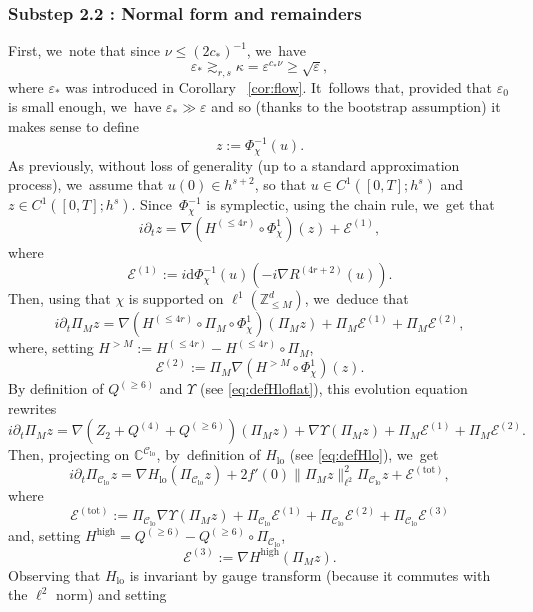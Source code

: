 \documentclass[JEP,XML,SOM,Unicode,published]{cedram}
\theoremstyle{plain}
\theoremstyle{definition}
\DeclareMathOperator{\lo}{lo}
\newcommand{\1}{\mathbf{1}}
\newcommand{\Clo}{\mathscr{C}_{\lo}}
\let\epsilon\varepsilon
\begin{document}
\subsubsection*{Substep 2.2 : Normal form and remainders}
First, we~note that since $\nu\leq(2c_\ast)^{-1}$, we~have
\begin{equation}
\label{eq:kappa_vs_eps1}
\varepsilon_\ast \gtrsim_{r,s} \kappa = \varepsilon^{c_\ast \nu} \geq \sqrt{\varepsilon},
\end{equation}
where $\epsilon_{\ast}$ was introduced in Corollary ~\ref{cor:flow}. It~follows that, provided that $\varepsilon_0$ is small enough, we~have $\varepsilon_\ast \gg \varepsilon$ and so (thanks to the bootstrap assumption) it makes sense to define
\[
z := \Phi_\chi^{-1}(u).
\]
As previously, without loss of generality (\ie up to a standard approximation process), we~assume that $u(0) \in h^{s+2}$, so that $u\in C^1([0,T];h^s)$ and $z \in C^1([0,T];h^s)$. Since~$\Phi_\chi^{-1}$ is symplectic, using the chain rule, we~get that
\[
i\partial_t z = \nabla (H^{(\leq 4r)} \circ \Phi_\chi^1)(z) + \mathcal{E}^{(1)},
\]
where
\[
\mathcal{E}^{(1)} := i\mathrm{d} \Phi_\chi^{-1}(u)(-i \nabla R^{(4r+2)}(u)).
\]
Then, using that $\chi$ is supported on $\ell^1(\mathbb{Z}^d_{\leq M})$, we~deduce that
\[
i\partial_t \Pi_M z = \nabla (H^{(\leq 4r)}\circ \Pi_M \circ \Phi_\chi^1)(\Pi_M z) + \Pi_M \mathcal{E}^{(1)} + \Pi_M \mathcal{E}^{(2)},
\]
where, setting $H^{>M} := H^{(\leq 4r)} - H^{(\leq 4r)} \circ \Pi_M$,
\[
\mathcal{E}^{(2)} := \Pi_M \nabla(H^{>M} \circ \Phi_\chi^1)(z).
\]
By definition of $Q^{(\geq 6)}$ and $\Upsilon$ (see \eqref{eq:defHloflat}), this evolution equation rewrites
\[
i\partial_t \Pi_M z = \nabla (Z_2 + Q^{(4)} + Q^{(\geq 6)})(\Pi_M z) + \nabla \Upsilon(\Pi_M z)+\Pi_M \mathcal{E}^{(1)} + \Pi_M \mathcal{E}^{(2)}.
\]
Then, projecting on $\mathbb{C}^{\Clo}$, by~definition of $ H_{\lo}$ (see \eqref{eq:defHlo}), we~get
\[
i\partial_t \Pi_{\Clo} z = \nabla H_{\lo}(\Pi_{\Clo} z) + 2f'(0) \| \Pi_{M} z \|_{\ell^2}^2 \Pi_{\Clo} z+ \mathcal{E}^{\mathrm{(tot)}},
\]
where
\begin{equation}
\label{eq:def_Etot}
\mathcal{E}^{\mathrm{(tot)}} := \Pi_{\Clo}\nabla \Upsilon(\Pi_M z)+\Pi_{\Clo} \mathcal{E}^{(1)} + \Pi_{\Clo}\mathcal{E}^{(2)} + \Pi_{\Clo}\mathcal{E}^{(3)}
\end{equation}
and, setting $H^{\mathrm{high}} = Q^{(\geq 6)} - Q^{(\geq 6)}\circ \Pi_{\Clo}$,
\[
\mathcal{E}^{(3)} := \nabla H^{\mathrm{high}}(\Pi_M z).
\]
Observing that $H_{\lo}$ is invariant by gauge transform (because it commutes with the $\ell^2$ norm) and setting
\end{document}
